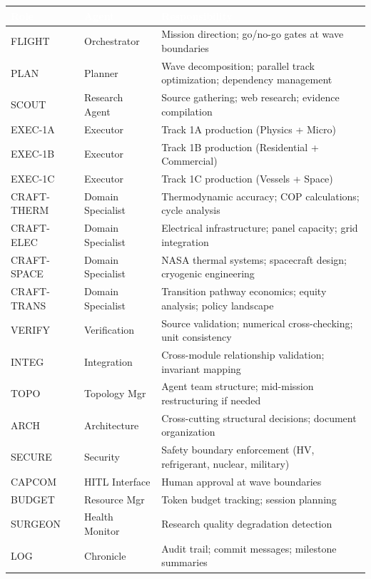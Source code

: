 \documentclass[11pt,letterpaper]{article}
\newcommand{\tableheader}[1]{\textbf{\sffamily\textcolor{white}{#1}}}
\begin{document}
\begin{center}
\begin{tabularx}{\textwidth}{L{2.2cm}L{2.2cm}X}
\toprule
{}
\tableheader{Role} & \tableheader{Agent} & \tableheader{Responsibility} \\
\midrule
FLIGHT & Orchestrator & Mission direction; go/no-go gates at wave boundaries \\
PLAN & Planner & Wave decomposition; parallel track optimization; dependency management \\
SCOUT & Research Agent & Source gathering; web research; evidence compilation \\
EXEC-1A & Executor & Track 1A production (Physics + Micro) \\
EXEC-1B & Executor & Track 1B production (Residential + Commercial) \\
EXEC-1C & Executor & Track 1C production (Vessels + Space) \\
CRAFT-THERM & Domain Specialist & Thermodynamic accuracy; COP calculations; cycle analysis \\
CRAFT-ELEC & Domain Specialist & Electrical infrastructure; panel capacity; grid integration \\
CRAFT-SPACE & Domain Specialist & NASA thermal systems; spacecraft design; cryogenic engineering \\
CRAFT-TRANS & Domain Specialist & Transition pathway economics; equity analysis; policy landscape \\
VERIFY & Verification & Source validation; numerical cross-checking; unit consistency \\
INTEG & Integration & Cross-module relationship validation; invariant mapping \\
TOPO & Topology Mgr & Agent team structure; mid-mission restructuring if needed \\
ARCH & Architecture & Cross-cutting structural decisions; document organization \\
SECURE & Security & Safety boundary enforcement (HV, refrigerant, nuclear, military) \\
CAPCOM & HITL Interface & Human approval at wave boundaries \\
BUDGET & Resource Mgr & Token budget tracking; session planning \\
SURGEON & Health Monitor & Research quality degradation detection \\
LOG & Chronicle & Audit trail; commit messages; milestone summaries \\
\bottomrule
\end{tabularx}
\end{center}
\end{document}

